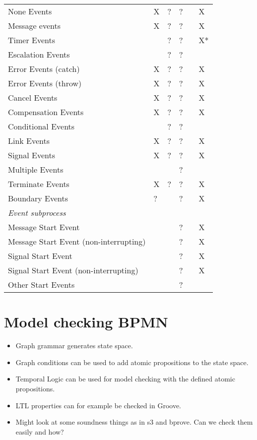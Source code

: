 \documentclass[adraft, copyright, creativecommons]{eptcs} %
\begin{document}
\begin{table}[h]
\begin{tabular}{l l l l l l}
      None Events & X & ? & ? &  & X\\
      Message events & X & ? & ? &  & X\\
      Timer Events &  & ? & ? &  & X*\\
      Escalation Events & & ? & ? &  & \\
      Error Events (catch) & X & ? & ? &  & \color{yellow}X\\ %
      Error Events (throw) & X & ? & ? &  & \color{yellow}X\\
      Cancel Events & X & ? & ? &  & \color{yellow}X\\
      Compensation Events & X & ? & ? &  & \color{yellow}X\\
      Conditional Events &  & ? & ? &  & \\
      Link Events & X & ? & ? &  & X\\
      Signal Events & X & ? & ? &  & X\\
      Multiple Events &  & & ? &  & \\
      Terminate Events & X & ? & ? &  & X\\
     Boundary Events & ? & & ? &  & X\\ %
      \textit{Event subprocess} &  &  &  &  & \\
      Message Start Event &  & & ? &  & X\\
      Message Start Event (non-interrupting) & & & ? &  & X\\
      Signal Start Event &  & & ? &  & X\\
      Signal Start Event (non-interrupting) &  & & ? &  & X\\
      Other Start Events &  & & ? &  & \\ %
    \end{tabular}

\end{table}

\section{Model checking BPMN}
\begin{itemize}
    \item Graph grammar generates state space.
    \item Graph conditions can be used to add atomic propositions to the state space.
    \item Temporal Logic can be used for model checking with the defined atomic propositions.
    \item LTL properties can for example be checked in Groove.
    \item Might look at some soundness things as in s3 and bprove. Can we check them easily and how?
\end{itemize}
\end{document}
